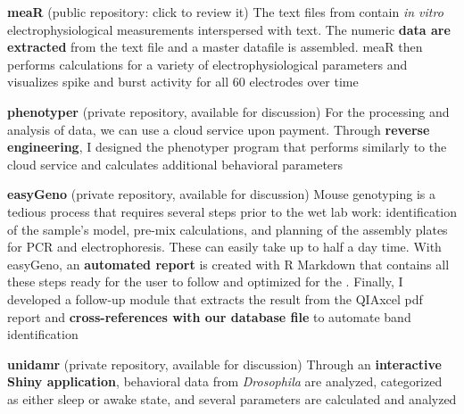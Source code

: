 \documentclass[
  a4paper, 
   maincolor=cvblue,
   sectioncolor=cvblue,
]{fortysecondscv}
\begin{document}
\textbf{meaR} (public repository: click  \href{https://github.com/adrianclo/meaR}{\color{blue}{here}} to review it) \newline
The text files from \href{https://www.multichannelsystems.com/products/vitro-mea-systems}{\color{blue}{Micro-Electrode Arrays}} contain \emph{in vitro} electrophysiological measurements interspersed with text.  The numeric \textbf{data are extracted} from the text file and a master datafile is assembled. meaR then performs calculations for a variety of electrophysiological parameters and visualizes spike and burst activity for all 60 electrodes over time \newline

\textbf{phenotyper} (private repository, available for discussion) \newline
For the processing and analysis of \href{https://www.sylics.com/bioinformatics/cognitionwall/}{\color{blue}{Phenotyper}} data, we can use a cloud service upon payment. Through \textbf{reverse engineering}, I designed the phenotyper program that performs similarly to the cloud service and calculates additional behavioral parameters \newline

\textbf{easyGeno} (private repository, available for discussion) \newline
Mouse genotyping is a tedious process that requires several steps prior to the wet lab work:  identification of the sample's model, pre-mix calculations, and planning of the assembly plates for PCR and electrophoresis. These can easily take up to half a day time. With easyGeno, an \textbf{automated report} is created with R Markdown that contains all these steps ready for the user to follow and optimized for the \href{https://www.qiagen.com/us/service-and-support/learning-hub/technologies-and-research-topics/sample-quality-control/instruments/qiaxcel-advanced/}{\color{blue}{QIAxcel apparatus}}. Finally, I developed a follow-up module that extracts the result from the QIAxcel pdf report and \textbf{cross-references with our database file} to automate band identification \newline

\textbf{unidamr} (private repository, available for discussion) \newline
Through an \textbf{interactive Shiny application}, behavioral data from \emph{Drosophila} are analyzed, categorized as either sleep or awake state, and several parameters are calculated and analyzed
\end{document}
